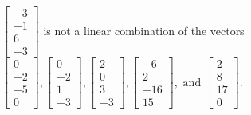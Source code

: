 \begin{exercise}
\begin{exerciseStatement}
  \end{exerciseStatement}
  \begin{exerciseAnswer}
   \(\left[\begin{array}{c}
-3 \\
-1 \\
6 \\
-3
\end{array}\right]\) 
  	 is not  
	a linear combination of the vectors \(\left[\begin{array}{c}
0 \\
-2 \\
-5 \\
0
\end{array}\right] , \left[\begin{array}{c}
0 \\
-2 \\
1 \\
-3
\end{array}\right] , \left[\begin{array}{c}
2 \\
0 \\
3 \\
-3
\end{array}\right] , \left[\begin{array}{c}
-6 \\
2 \\
-16 \\
15
\end{array}\right] , \text{ and } \left[\begin{array}{c}
2 \\
8 \\
17 \\
0
\end{array}\right]\).

	
  


  \end{exerciseAnswer}
\end{exercise}